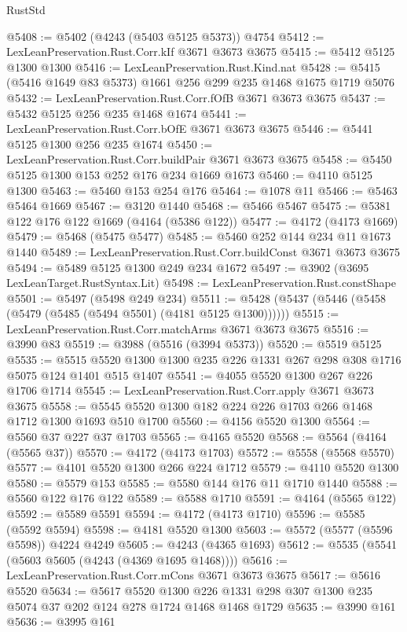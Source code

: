 \begin{lexlean}{RustStd}
\begin{coremodule}
@5408 := @5402 (@4243 (@5403 @5125 @5373)) @4754
@5412 := LexLeanPreservation.Rust.Corr.kIf @3671 @3673 @3675
@5415 := @5412 @5125 @1300 @1300
@5416 := LexLeanPreservation.Rust.Kind.nat
@5428 := @5415 (@5416 @1649 @83 @5373) @1661 @256 @299 @235 @1468 @1675 @1719 @5076
@5432 := LexLeanPreservation.Rust.Corr.fOfB @3671 @3673 @3675
@5437 := @5432 @5125 @256 @235 @1468 @1674
@5441 := LexLeanPreservation.Rust.Corr.bOfE @3671 @3673 @3675
@5446 := @5441 @5125 @1300 @256 @235 @1674
@5450 := LexLeanPreservation.Rust.Corr.buildPair @3671 @3673 @3675
@5458 := @5450 @5125 @1300 @153 @252 @176 @234 @1669 @1673
@5460 := @4110 @5125 @1300
@5463 := @5460 @153 @254 @176
@5464 := @1078 @11
@5466 := @5463 @5464 @1669
@5467 := @3120 @1440
@5468 := @5466 @5467
@5475 := @5381 @122 @176 @122 @1669 (@4164 (@5386 @122))
@5477 := @4172 (@4173 @1669)
@5479 := @5468 (@5475 @5477)
@5485 := @5460 @252 @144 @234 @11 @1673 @1440
@5489 := LexLeanPreservation.Rust.Corr.buildConst @3671 @3673 @3675
@5494 := @5489 @5125 @1300 @249 @234 @1672
@5497 := @3902 (@3695 LexLeanTarget.RustSyntax.Lit)
@5498 := LexLeanPreservation.Rust.constShape
@5501 := @5497 (@5498 @249 @234)
@5511 := @5428 (@5437 (@5446 (@5458 (@5479 (@5485 (@5494 @5501) (@4181 @5125 @1300))))))
@5515 := LexLeanPreservation.Rust.Corr.matchArms @3671 @3673 @3675
@5516 := @3990 @83
@5519 := @3988 (@5516 (@3994 @5373))
@5520 := @5519 @5125
@5535 := @5515 @5520 @1300 @1300 @235 @226 @1331 @267 @298 @308 @1716 @5075 @124 @1401 @515 @1407
@5541 := @4055 @5520 @1300 @267 @226 @1706 @1714
@5545 := LexLeanPreservation.Rust.Corr.apply @3671 @3673 @3675
@5558 := @5545 @5520 @1300 @182 @224 @226 @1703 @266 @1468 @1712 @1300 @1693 @510 @1700
@5560 := @4156 @5520 @1300
@5564 := @5560 @37 @227 @37 @1703
@5565 := @4165 @5520
@5568 := @5564 (@4164 (@5565 @37))
@5570 := @4172 (@4173 @1703)
@5572 := @5558 (@5568 @5570)
@5577 := @4101 @5520 @1300 @266 @224 @1712
@5579 := @4110 @5520 @1300
@5580 := @5579 @153
@5585 := @5580 @144 @176 @11 @1710 @1440
@5588 := @5560 @122 @176 @122
@5589 := @5588 @1710
@5591 := @4164 (@5565 @122)
@5592 := @5589 @5591
@5594 := @4172 (@4173 @1710)
@5596 := @5585 (@5592 @5594)
@5598 := @4181 @5520 @1300
@5603 := @5572 (@5577 (@5596 @5598)) @4224 @4249
@5605 := @4243 (@4365 @1693)
@5612 := @5535 (@5541 (@5603 @5605 (@4243 (@4369 @1695 @1468))))
@5616 := LexLeanPreservation.Rust.Corr.mCons @3671 @3673 @3675
@5617 := @5616 @5520
@5634 := @5617
    @5520
    @1300
    @226
    @1331
    @298
    @307
    @1300
    @235
    @5074
    @37
    @202
    @124
    @278
    @1724
    @1468
    @1468
    @1729
@5635 := @3990 @161
@5636 := @3995 @161

\end{coremodule}
\end{lexlean}

